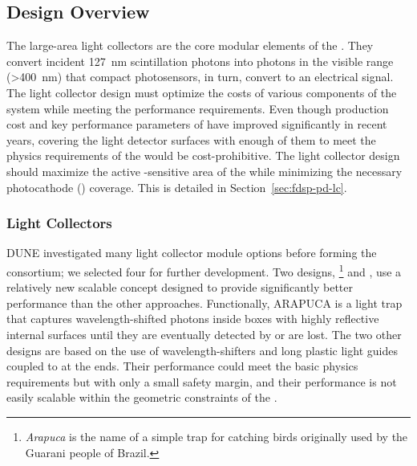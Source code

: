 \subsection{Design Overview}
\label{sec:pds:des-ov}

The  large-area light collectors are the core modular elements of the .  They convert incident \SI{127}{nm} scintillation photons into photons in the visible range (>\SI{400}{nm}) that compact  photosensors, in turn,  convert to an electrical signal. The light collector design must optimize the costs of various components of the system while meeting the performance requirements.  Even though production cost and key performance parameters of  have improved significantly in recent years, covering the light detector surfaces with enough of them to meet the physics requirements of the  would be cost-prohibitive. 
The light collector design should maximize the active -sensitive area of the  while minimizing the necessary photocathode () coverage. This is detailed in
Section~\ref{sec:fdsp-pd-lc}.

\subsubsection{Light Collectors} 
\label{sssec:photoncollectors}

DUNE investigated many  light collector module options before forming the \single {} consortium; we selected four for further development. 
Two designs, \footnote{\textit{Arapuca} is the name of a simple trap for catching birds originally used by the Guarani people of Brazil.} %
and , %
use a relatively new scalable concept designed to provide  
significantly better performance than the other approaches. Functionally, ARAPUCA is a light trap that captures wavelength-shifted photons inside boxes with highly reflective internal surfaces until they are eventually detected by  or are lost.  The two other designs are based on the use of wavelength-shifters and long plastic light guides coupled to  at the ends. Their performance could meet the basic physics requirements but with only a small safety margin, and their performance is not easily scalable within the geometric constraints of the . 

